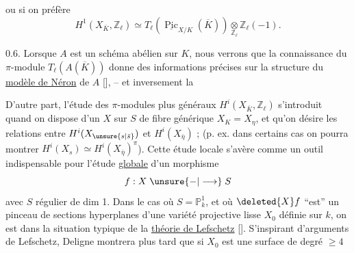 ou si on préfère
\[
H^1(X_{\overline K},\mathbb Z_\ell)\simeq T_\ell(\underline{\operatorname{Pic}}_{X/K}(\overline K))\underset{\mathbb Z_\ell}{\otimes}\mathbb Z_\ell(-1).
\]

0.6. Lorsque \(A\) est un schéma abélien sur \(K\), nous verrons que la connaissance du \(\pi\)-module \(T_\ell(A(\overline K))\) donne des informations  précises sur la structure du \uline{modèle de Néron} de \(A\) [\quad], -- et inversement la 

D'autre part, l'étude des \(\pi\)-modules plus généraux \(H^i(X_{\overline K},\mathbb Z_\ell)\) s'introduit quand on  dispose d'un   \(X\)  sur \(S\) de fibre générique \(X_K=X_\eta\), et qu'on désire  les relations entre  \(H^i(X_{\unsure{s|\bar s}})\) et \(H^i(X_{\bar\eta})\) ; (p. ex. dans certains cas on pourra montrer \(H^i(X_s)\simeq H^i(X_{\bar\eta})^\pi\)). Cette  étude locale s'avère comme un outil indispensable pour l'étude  \uline{globale} d'un morphisme
\[
f:X\mathrel{\unsure{-|\longrightarrow}}S
\]
avec \(S\) régulier de dim 1.  Dans le cas où \(S=\mathbb P^1_k\), et où \(\deleted{X}f\) ``est''  un pinceau  de sections hyperplanes d'une variété projective lisse \(X_0\) définie sur \(k\), on est dans la situation typique de la \uline{théorie de Lefschetz} [\quad]. S'inspirant d'arguments de Lefschetz, Deligne montrera plus tard que si \(X_0\) est une surface de degré \(\geq4\)
